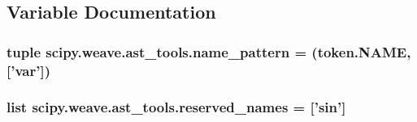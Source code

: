 \subsection{Variable Documentation}
\hypertarget{namespacescipy_1_1weave_1_1ast__tools_a398fc9436783b148d1e95b78cbd748fe}{}
\subsubsection[{name\+\_\+pattern}]{\setlength{\rightskip}{0pt plus 5cm}tuple scipy.\+weave.\+ast\+\_\+tools.\+name\+\_\+pattern = (token.\+N\+A\+M\+E, \mbox{[}'var'\mbox{]})}\label{namespacescipy_1_1weave_1_1ast__tools_a398fc9436783b148d1e95b78cbd748fe}
\hypertarget{namespacescipy_1_1weave_1_1ast__tools_a28a0ddb5e38b6f83afd7cccf413f504b}{}
\subsubsection[{reserved\+\_\+names}]{\setlength{\rightskip}{0pt plus 5cm}list scipy.\+weave.\+ast\+\_\+tools.\+reserved\+\_\+names = \mbox{[}'{\bf sin}'\mbox{]}}\label{namespacescipy_1_1weave_1_1ast__tools_a28a0ddb5e38b6f83afd7cccf413f504b}
